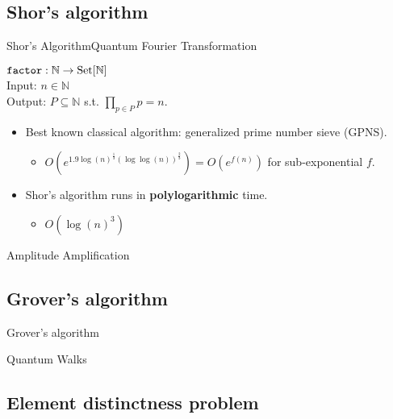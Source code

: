 \documentclass{beamer}
\newcommand{\mt}[1]{\textnormal{#1}}
\begin{document}
\subsection{Shor's algorithm}

\begin{frame}{Shor's Algorithm}{Quantum Fourier Transformation}
	\begin{definition}
		$\texttt{factor} : \mathbb{N} \rightarrow \mt{Set}[\mathbb{N}]$\\
		\quad Input: $n \in \mathbb{N}$\\
		\quad Output: $P \subseteq \mathbb{N}$ s.t. $\prod\limits_{p \in P} p = n$.
	\end{definition}

	\begin{itemize}
		\item Best known classical algorithm: generalized prime number sieve (GPNS).
			\begin{itemize}
				\item $O(e^{1.9 \log(n)^{\frac{1}{3}} (\log\log(n))^{\frac{2}{3}}}) = O(e^{f(n)})$ for sub-exponential $f$.
			\end{itemize}
			
		\item Shor's algorithm runs in \textbf{polylogarithmic} time.
			\begin{itemize}
				\item $O(\log(n)^3)$
			\end{itemize}
	\end{itemize}
\end{frame}

\begin{frame}{Amplitude Amplification}
\end{frame}

\subsection{Grover's algorithm}

\begin{frame}{Grover's algorithm}
\end{frame}

\begin{frame}{Quantum Walks}
\end{frame}

\subsection{Element distinctness problem}
\end{document}
